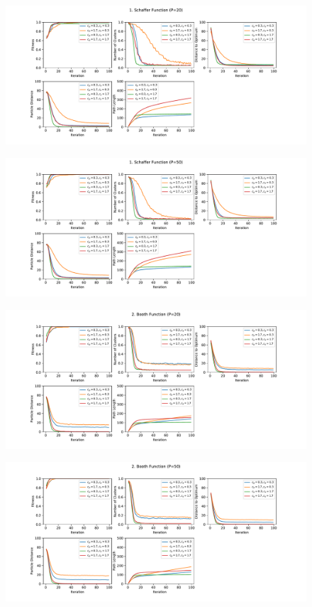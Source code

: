 \documentclass[12pt]{article}
\begin{document}
\begin{figure}
	\centering
	\includegraphics[width=1\textwidth]{figures/ex4/ex4-1-20.pdf}
	\label{fig:ex4-1-20}
\end{figure}
\begin{figure}
	\centering
	\includegraphics[width=1\textwidth]{figures/ex4/ex4-1-50.pdf}
	\label{fig:ex4-1-50}
\end{figure}
\begin{figure}
	\centering
	\includegraphics[width=1\textwidth]{figures/ex4/ex4-2-20.pdf}
	\label{fig:ex4-2-20}
\end{figure}
\begin{figure}
	\centering
	\includegraphics[width=1\textwidth]{figures/ex4/ex4-2-50.pdf}
	\label{fig:ex4-2-50}
\end{figure}
\end{document}
